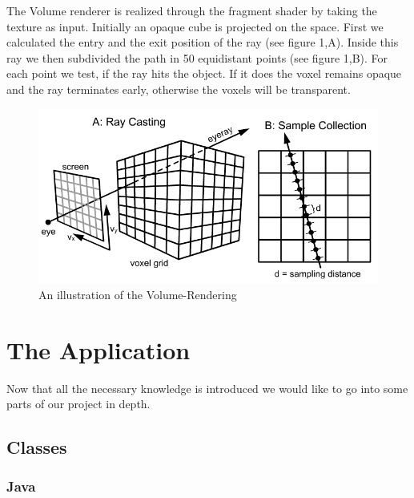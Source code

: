 \documentclass[10pt,twocolumn,letterpaper]{article}
\begin{document}
The Volume renderer is realized through the fragment shader by taking the texture as input. Initially an opaque cube is projected on the space. First we calculated the entry and the exit position of the ray (see figure 1,A). Inside this ray we then subdivided the path in 50 equidistant points (see figure 1,B). For each point we test, if the ray hits the object. If it does the voxel remains opaque and the ray terminates early, otherwise the voxels will be transparent. 
\begin{figure}[h]
	\begin{center}
		\includegraphics[width=0.8\linewidth]{./raycast.jpg}
		\caption{An illustration of the Volume-Rendering}
		\label{fig:texture}
	\end{center}
\end{figure}

\section{The Application}

Now that all the necessary knowledge is introduced we would like to go into some parts of our project in depth.

\subsection{Classes}
\subsubsection{Java}
\end{document}
